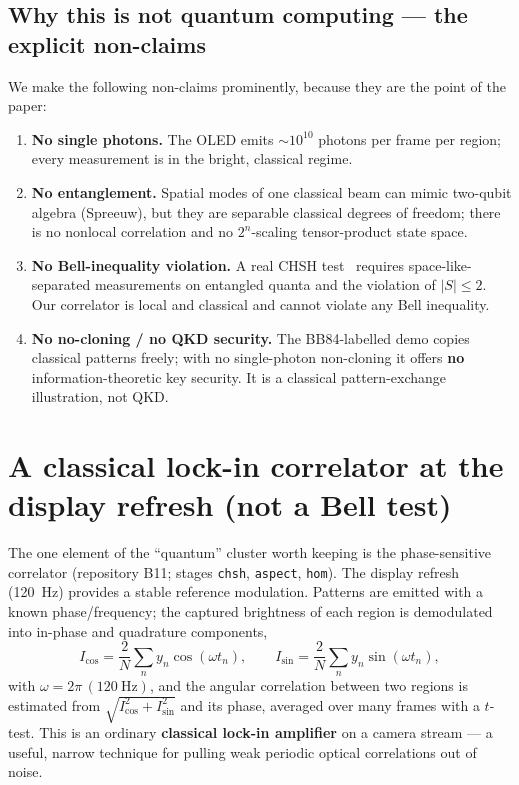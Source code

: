 \documentclass[11pt]{article}
\begin{document}
\subsection{Why this is not quantum computing --- the explicit non-claims}
We make the following non-claims prominently, because they are the point of the paper:
\begin{enumerate}
\item \textbf{No single photons.} The OLED emits $\sim\!10^{10}$ photons per frame per region;
every measurement is in the bright, classical regime.
\item \textbf{No entanglement.} Spatial modes of one classical beam can mimic two-qubit algebra
(Spreeuw), but they are separable classical degrees of freedom; there is no nonlocal
correlation and no $2^n$-scaling tensor-product state space.
\item \textbf{No Bell-inequality violation.} A real CHSH test~\cite{chsh} requires
space-like-separated measurements on entangled quanta and the violation of $|S|\le 2$. Our
correlator is local and classical and cannot violate any Bell inequality.
\item \textbf{No no-cloning / no QKD security.} The BB84-labelled demo copies classical patterns
freely; with no single-photon non-cloning it offers \textbf{no} information-theoretic key
security. It is a classical pattern-exchange illustration, not QKD.
\end{enumerate}

\section{A classical lock-in correlator at the display refresh (not a Bell test)}
The one element of the ``quantum'' cluster worth keeping is the phase-sensitive correlator
(repository B11; stages \texttt{chsh}, \texttt{aspect}, \texttt{hom}). The display refresh
(\SI{120}{\hertz}) provides a stable reference modulation. Patterns are emitted with a known
phase/frequency; the captured brightness of each region is demodulated into in-phase and
quadrature components,
\begin{equation}
I_{\cos} = \frac{2}{N}\sum_n y_n \cos(\omega t_n), \qquad
I_{\sin} = \frac{2}{N}\sum_n y_n \sin(\omega t_n),
\end{equation}
with $\omega = 2\pi\,(\SI{120}{\hertz})$, and the angular correlation between two regions is
estimated from $\sqrt{I_{\cos}^2 + I_{\sin}^2}$ and its phase, averaged over many frames with a
$t$-test. This is an ordinary \textbf{classical lock-in amplifier} on a camera stream --- a
useful, narrow technique for pulling weak periodic optical correlations out of noise.
\end{document}
